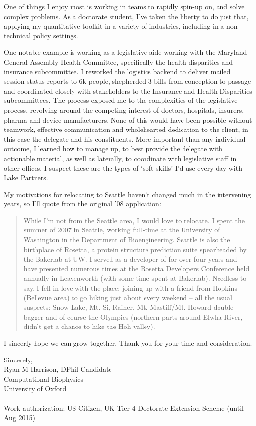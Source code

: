 \documentclass{../res}
\begin{document}
\begin{sloppypar}
\begin{resume}
One of things I enjoy most is working in teams to rapidly spin-up on, and solve complex problems. As a doctorate student, I've taken the liberty to do just that, applying my quantitative toolkit in a variety of industries, including in a non-technical policy settings.

One notable example is working as a legislative aide working with the Maryland General Assembly Health Committee, specifically the health disparities and insurance subcommittee. I reworked the logistics backend to deliver mailed session status reports to 6k people, shepherded 3 bills from conception to passage and coordinated closely with stakeholders to the Insurance and Health Disparities subcommittees. The process exposed me to the complexities of the legislative process, revolving around the competing interest of doctors, hospitals, insurers, pharma and device manufacturers. None of this would have been possible without teamwork, effective communication and wholehearted dedication to the client, in this case the delegate and his constituents. More important than any individual outcome, I learned how to manage up, to best provide the delegate with actionable material, as well as laterally, to coordinate with legislative staff in other offices. I suspect these are the types of `soft skills' I'd use every day with Lake Partners.

My motivations for relocating to Seattle haven't changed much in the intervening years, so I'll quote from the original '08 application:

\blockquote{While I'm not from the Seattle area, I would love to relocate. I spent the summer of 2007 in Seattle, working full-time at the University of Washington in the Department of Bioengineering. Seattle is also the birthplace of Rosetta, a protein structure prediction suite spearheaded by the Bakerlab at UW. I served as a developer of for over four years and have presented numerous times at the Rosetta Developers Conference held annually in Leavenworth (with some time spent at Bakerlab). Needless to say, I fell in love with the place; joining up with a friend from Hopkins (Bellevue area) to go hiking just about every weekend -- all the usual suspects: Snow Lake, Mt. Si, Rainer, Mt. Mastiff/Mt. Howard double bagger and of course the Olympics (northern parts around Elwha River, didn't get a chance to hike the Hoh valley).}

I sincerly hope we can grow together. Thank you for your time and consideration.

Sincerely, \\
Ryan M Harrison, DPhil Candidate \\
Computational Biophysics \\
University of Oxford \\ \\
Work authorization: US Citizen, UK Tier 4 Doctorate Extension Scheme (until Aug 2015)
\end{resume} 
\end{sloppypar}
\end{document}
